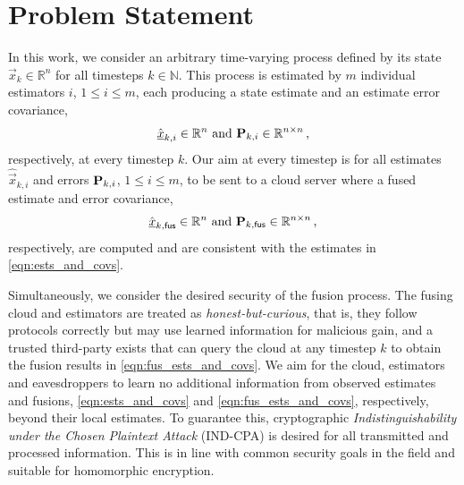 \documentclass[letterpaper, 10 pt, conference]{ieeeconf}
\begin{document}
\section{Problem Statement}\label{sec:problem}
In this work, we consider an arbitrary time-varying process defined by its state $\vec{x}_k \in \mathbb{R}^n$ for all timesteps $k \in \mathbb{N}$. This process is estimated by $m$ individual estimators $i$, $1\leq i\leq m$, each producing a state estimate and an estimate error covariance,
\begin{equation}\label{eqn:ests_and_covs}
    \hat{{\underline{x}}}_{k,i} \in \mathbb{R}^n \text{ and } {\ensuremath{{\mathbf{P}}}}_{k,i} \in \mathbb{R}^{n\times n}\,,
\end{equation}
respectively, at every timestep $k$. Our aim at every timestep is for all estimates $\hat{\vec{x}}_{k,i}$ and errors ${{\mathbf{P}}}_{k,i}$, $1\leq i\leq m$, to be sent to a cloud server where a fused estimate and error covariance,
\begin{equation}\label{eqn:fus_ests_and_covs}
    \hat{{\underline{x}}}_{k,\mathsf{fus}} \in \mathbb{R}^n \text{ and } {\ensuremath{{\mathbf{P}}}}_{k,\mathsf{fus}} \in \mathbb{R}^{n\times n}\,,
\end{equation}
respectively, are computed and are consistent with the estimates in \eqref{eqn:ests_and_covs}.

Simultaneously, we consider the desired security of the fusion process. The fusing cloud and estimators are treated as \textit{honest-but-curious}, that is, they follow protocols correctly but may use learned information for malicious gain, and a trusted third-party exists that can query the cloud at any timestep $k$ to obtain the fusion results in \eqref{eqn:fus_ests_and_covs}. We aim for the cloud, estimators and eavesdroppers to learn no additional information from observed estimates and fusions, \eqref{eqn:ests_and_covs} and \eqref{eqn:fus_ests_and_covs}, respectively, beyond their local estimates. To guarantee this, cryptographic \textit{Indistinguishability under the Chosen Plaintext Attack} (IND-CPA) \cite{katzIntroductionModernCryptography2008} is desired for all transmitted and processed information. This is in line with common security goals in the field and suitable for homomorphic encryption.

% 
%                                                                 
%                                                                 
%                                                                 
% 
\end{document}
